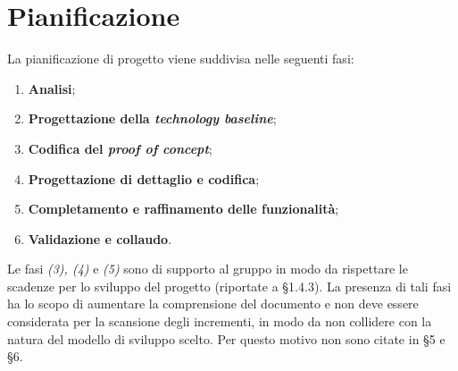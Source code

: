 \section{Pianificazione}
La pianificazione di progetto viene suddivisa nelle seguenti fasi:
\begin{enumerate}

	\item \textbf{Analisi};
	\item \textbf{Progettazione della \textit{technology baseline}};
	\item \textbf{Codifica del \textit{proof of concept}};
	\item \textbf{Progettazione di dettaglio e codifica};
	\item \textbf{Completamento e raffinamento delle funzionalità};
	\item \textbf{Validazione e collaudo}.
\end{enumerate}

Le fasi \textit{(3), (4)} e \textit{(5)} sono di supporto al gruppo in modo da rispettare le scadenze per lo sviluppo del progetto (riportate a \S 1.4.3). La presenza di tali fasi ha lo scopo di aumentare la comprensione del documento e non deve essere considerata per la scansione degli incrementi, in modo da non collidere con la natura del modello di sviluppo scelto. Per questo motivo non sono citate in \S 5 e \S 6.

\newpage

\newpage

\newpage

\newpage

\newpage
